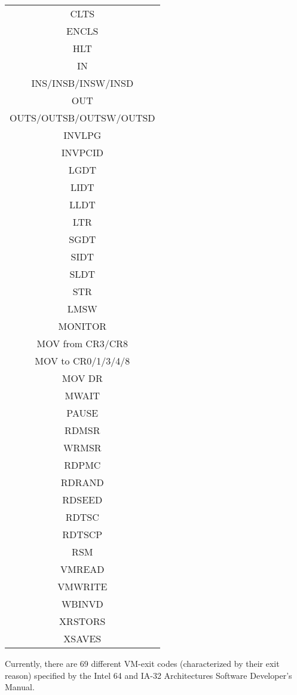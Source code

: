 \documentclass{report}
\begin{document}
\begin{spacing}{1.5}
{\begin{longtable}{|c|}
\large{CLTS} \\
\large{ENCLS} \\
\large{HLT} \\
\large{IN } \\
\large{INS/INSB/INSW/INSD } \\
\large{OUT} \\
\large{OUTS/OUTSB/OUTSW/OUTSD} \\
\large{INVLPG } \\
\large{INVPCID} \\
\large{LGDT} \\
\large{LIDT} \\
\large{LLDT} \\
\large{LTR} \\
\large{SGDT} \\
\large{SIDT} \\
\large{SLDT} \\
\large{STR} \\
\large{LMSW } \\
\large{MONITOR } \\
\large{MOV from CR3/CR8 } \\
\large{MOV to CR0/1/3/4/8 } \\
\large{MOV DR} \\
\large{MWAIT} \\
\large{PAUSE} \\
\large{RDMSR} \\
\large{WRMSR} \\
\large{RDPMC} \\
\large{RDRAND} \\
\large{RDSEED} \\
\large{RDTSC} \\
\large{RDTSCP} \\
\large{RSM} \\
\large{VMREAD} \\
\large{VMWRITE} \\
\large{WBINVD} \\
\large{XRSTORS} \\
\large{XSAVES} \\


\end{longtable}
\leavevmode\newline
\newline
}


{\large
\noindent Currently, there are 69 different VM-exit codes (characterized by their exit reason) specified by the Intel 64 and IA-32 Architectures Software Developer’s Manual.
\newline
}



\end{spacing}
\end{document}

